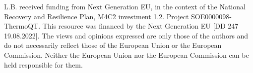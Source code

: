 \documentclass[preprint,12pt]{elsarticle}
\begin{document}
\sloppy
L.B. received funding from Next Generation EU, in the context of the National
Recovery and Resilience Plan, M4C2 investment 1.2. Project SOE0000098-ThermoQT. This resource was financed by the Next Generation EU [DD 247 19.08.2022]. The
views and opinions expressed are only those of the authors and do not
necessarily reflect those of the European Union or the European Commission.
Neither the European Union nor the European Commission can be held responsible
for them.













\end{document}
